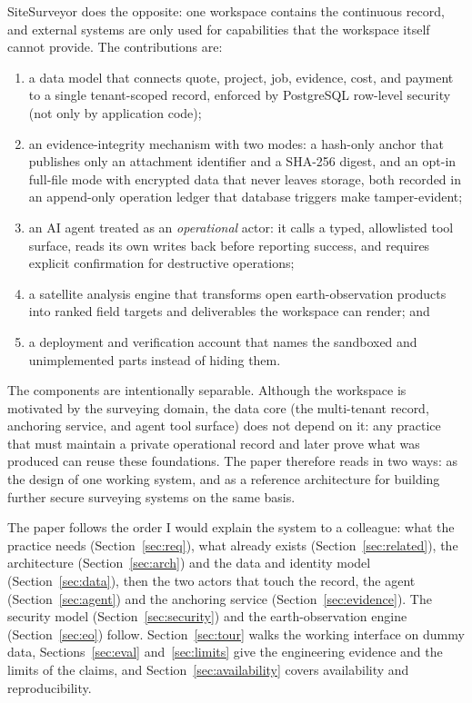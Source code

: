 \documentclass[10pt,a4paper,twocolumn]{article}
\begin{document}
SiteSurveyor does the opposite: one workspace contains the continuous record, and external
systems are only used for capabilities that the workspace itself cannot provide. The
contributions are:

\begin{enumerate}
  \item a data model that connects quote, project, job, evidence, cost, and payment to a
        single tenant-scoped record, enforced by PostgreSQL row-level security (not only by
        application code);
  \item an evidence-integrity mechanism with two modes: a hash-only anchor that publishes
        only an attachment identifier and a SHA-256 digest, and an opt-in full-file mode
        with encrypted data that never leaves storage, both recorded in an append-only
        operation ledger that database triggers make tamper-evident;
  \item an AI agent treated as an \emph{operational} actor: it calls a typed, allowlisted tool
        surface, reads its own writes back before reporting success, and requires explicit
        confirmation for destructive operations;
  \item a satellite analysis engine that transforms open earth-observation products into
        ranked field targets and deliverables the workspace can render; and
  \item a deployment and verification account that names the sandboxed and
        unimplemented parts instead of hiding them.
\end{enumerate}

The components are intentionally separable. Although the workspace is motivated by the
surveying domain, the data core (the multi-tenant record, anchoring service, and agent tool
surface) does not depend on it: any practice that must maintain a private operational record
and later prove what was produced can reuse these foundations. The paper therefore reads in
two ways: as the design of one working system, and as a reference architecture for building
further secure surveying systems on the same basis.

The paper follows the order I would explain the system to a colleague: what the
practice needs (Section~\ref{sec:req}), what already exists (Section~\ref{sec:related}),
the architecture (Section~\ref{sec:arch}) and the data and identity model
(Section~\ref{sec:data}), then the two actors that touch the record, the agent
(Section~\ref{sec:agent}) and the anchoring service (Section~\ref{sec:evidence}). The
security model (Section~\ref{sec:security}) and the earth-observation engine
(Section~\ref{sec:eo}) follow. Section~\ref{sec:tour} walks the working interface on
dummy data, Sections~\ref{sec:eval} and~\ref{sec:limits} give the engineering evidence
and the limits of the claims, and Section~\ref{sec:availability} covers availability
and reproducibility.
\end{document}
